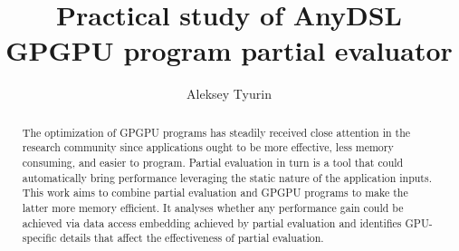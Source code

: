 \title{Practical study of AnyDSL GPGPU program partial evaluator}

\author{Aleksey Tyurin}


\graphicspath{{Tyurin/}}

\newtheorem{mytheorem}{Theorem}
\newtheorem{mydef}{Definition}
\renewcommand{\abstractname}{Abstract}
\renewcommand*{\proofname}{Proof}
\renewcommand*{\figurename}{Figure}
\renewcommand*{\tablename}{Table}
\renewcommand*{\refname}{References}


\maketitle

\begin{abstract}
	The optimization of GPGPU programs has steadily received close attention 
	in the research community since applications ought to be more effective,
	 less memory consuming, and easier to program.
	  Partial evaluation in turn is a tool that could automatically bring performance leveraging the static nature of the application inputs.
	   This work aims to combine partial evaluation and GPGPU programs to make the latter more memory efficient.
It analyses whether any performance gain could be achieved via
 data access embedding achieved by partial evaluation and identifies GPU-specific details that affect the effectiveness of partial evaluation.
\end{abstract}







